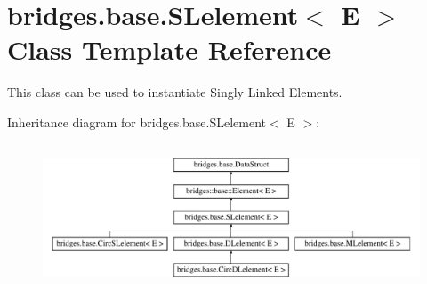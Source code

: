 \hypertarget{classbridges_1_1base_1_1_s_lelement}{}\section{bridges.\+base.\+S\+Lelement$<$ E $>$ Class Template Reference}
\label{classbridges_1_1base_1_1_s_lelement}


This class can be used to instantiate Singly Linked Elements.  


Inheritance diagram for bridges.\+base.\+S\+Lelement$<$ E $>$\+:\begin{figure}[H]
\begin{center}
\leavevmode
\includegraphics[height=4.402516cm]{classbridges_1_1base_1_1_s_lelement}
\end{center}
\end{figure}
